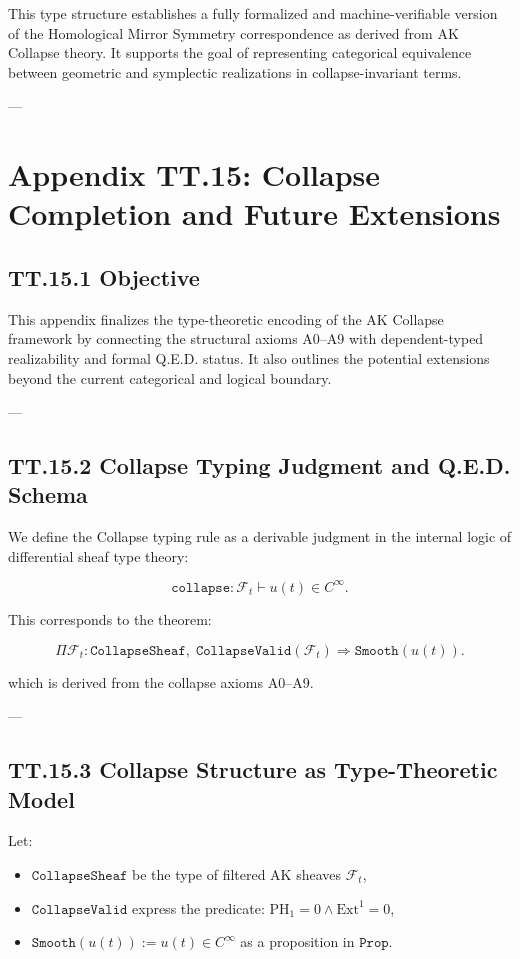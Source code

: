 \documentclass[11pt]{article}
\begin{document}
This type structure establishes a fully formalized and machine-verifiable version  
of the Homological Mirror Symmetry correspondence as derived from AK Collapse theory.  
It supports the goal of representing categorical equivalence  
between geometric and symplectic realizations in collapse-invariant terms.

---

\section*{Appendix TT.15: Collapse Completion and Future Extensions}

\subsection*{TT.15.1 Objective}

This appendix finalizes the type-theoretic encoding of the AK Collapse framework by connecting the structural axioms A0–A9  
with dependent-typed realizability and formal Q.E.D. status.  
It also outlines the potential extensions beyond the current categorical and logical boundary.

---

\subsection*{TT.15.2 Collapse Typing Judgment and Q.E.D. Schema}

We define the Collapse typing rule as a derivable judgment in the internal logic of differential sheaf type theory:

\[
\texttt{collapse} : \mathcal{F}_t \vdash u(t) \in C^\infty.
\]

This corresponds to the theorem:

\[
\Pi \mathcal{F}_t : \texttt{CollapseSheaf},\;
\texttt{CollapseValid}(\mathcal{F}_t)
\Rightarrow
\texttt{Smooth}(u(t)).
\]

which is derived from the collapse axioms A0–A9.

---

\subsection*{TT.15.3 Collapse Structure as Type-Theoretic Model}

Let:

\begin{itemize}
  \item $\texttt{CollapseSheaf}$ be the type of filtered AK sheaves $\mathcal{F}_t$,
  \item $\texttt{CollapseValid}$ express the predicate: $\mathrm{PH}_1 = 0 \wedge \mathrm{Ext}^1 = 0$,
  \item $\texttt{Smooth}(u(t)) := u(t) \in C^\infty$ as a proposition in $\texttt{Prop}$.
\end{itemize}
\end{document}
